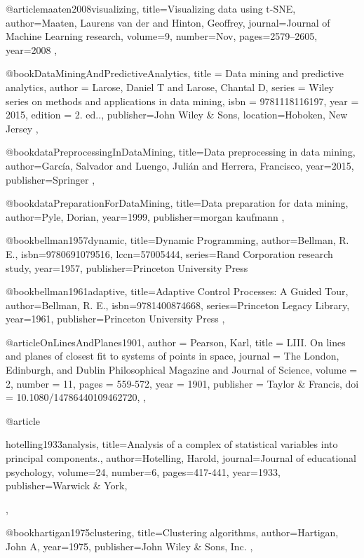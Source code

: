 @article{maaten2008visualizing,
  title={Visualizing data using t-SNE},
  author={Maaten, Laurens van der and Hinton, Geoffrey},
  journal={Journal of Machine Learning research},
  volume={9},
  number={Nov},
  pages={2579--2605},
  year={2008}
},

@book{DataMiningAndPredictiveAnalytics,
  title = {Data mining and predictive analytics},
  author = {Larose, Daniel T and Larose, Chantal D},
  series = {Wiley series on methods and applications in data mining},
  isbn = {9781118116197},
  year = {2015},
  edition = {2. ed..},
  publisher={John Wiley \& Sons},
  location={Hoboken, New Jersey}
},

@book{dataPreprocessingInDataMining,
  title={Data preprocessing in data mining},
  author={García, Salvador and Luengo, Julián and Herrera, Francisco},
  year={2015},
  publisher={Springer}
},

@book{dataPreparationForDataMining,
  title={Data preparation for data mining},
  author={Pyle, Dorian},
  year={1999},
  publisher={morgan kaufmann}
},

@book{bellman1957dynamic,
  title={Dynamic Programming},
  author={Bellman, R. E.},
  isbn={9780691079516},
  lccn={57005444},
  series={Rand Corporation research study},
  year={1957},
  publisher={Princeton University Press}
}

@book{bellman1961adaptive,
  title={Adaptive Control Processes: A Guided Tour},
  author={Bellman, R. E.},
  isbn={9781400874668},
  series={Princeton Legacy Library},
  year={1961},
  publisher={Princeton University Press}
},

@article{OnLinesAndPlanes1901,
  author = {Pearson, Karl},
  title = {LIII. On lines and planes of closest fit to systems of points in space},
  journal = {The London, Edinburgh, and Dublin Philosophical Magazine and Journal of Science},
  volume = {2},
  number = {11},
  pages = {559-572},
  year  = {1901},
  publisher = {Taylor & Francis},
  doi = {10.1080/14786440109462720},
},

@article{hotelling1933analysis,
  title={Analysis of a complex of statistical variables into principal components.},
  author={Hotelling, Harold},
  journal={Journal of educational psychology},
  volume={24},
  number={6},
  pages={417-441},
  year={1933},
  publisher={Warwick \& York},

},

@book{hartigan1975clustering,
  title={Clustering algorithms},
  author={Hartigan, John A},
  year={1975},
  publisher={John Wiley \& Sons, Inc.}
},

